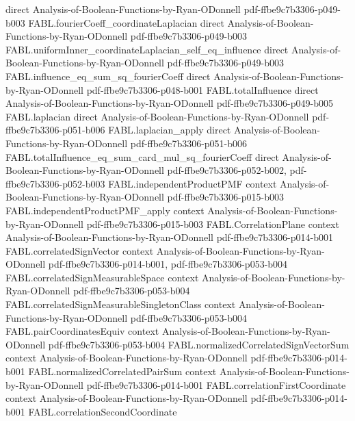 \begin{theorem}
  {direct}
  {Analysis-of-Boolean-Functions-by-Ryan-ODonnell}
  {pdf-ffbe9c7b3306-p049-b003}
\proofstep
  {FABL.fourierCoeff_coordinateLaplacian}
  {direct}
  {Analysis-of-Boolean-Functions-by-Ryan-ODonnell}
  {pdf-ffbe9c7b3306-p049-b003}
\proofstep
  {FABL.uniformInner_coordinateLaplacian_self_eq_influence}
  {direct}
  {Analysis-of-Boolean-Functions-by-Ryan-ODonnell}
  {pdf-ffbe9c7b3306-p049-b003}
\proofstep
  {FABL.influence_eq_sum_sq_fourierCoeff}
  {direct}
  {Analysis-of-Boolean-Functions-by-Ryan-ODonnell}
  {pdf-ffbe9c7b3306-p048-b001}
\proofstep
  {FABL.totalInfluence}
  {direct}
  {Analysis-of-Boolean-Functions-by-Ryan-ODonnell}
  {pdf-ffbe9c7b3306-p049-b005}
\proofstep
  {FABL.laplacian}
  {direct}
  {Analysis-of-Boolean-Functions-by-Ryan-ODonnell}
  {pdf-ffbe9c7b3306-p051-b006}
\proofstep
  {FABL.laplacian_apply}
  {direct}
  {Analysis-of-Boolean-Functions-by-Ryan-ODonnell}
  {pdf-ffbe9c7b3306-p051-b006}
\proofstep
  {FABL.totalInfluence_eq_sum_card_mul_sq_fourierCoeff}
  {direct}
  {Analysis-of-Boolean-Functions-by-Ryan-ODonnell}
  {pdf-ffbe9c7b3306-p052-b002,
    pdf-ffbe9c7b3306-p052-b003}
\proofstep
  {FABL.independentProductPMF}
  {context}
  {Analysis-of-Boolean-Functions-by-Ryan-ODonnell}
  {pdf-ffbe9c7b3306-p015-b003}
\proofstep
  {FABL.independentProductPMF_apply}
  {context}
  {Analysis-of-Boolean-Functions-by-Ryan-ODonnell}
  {pdf-ffbe9c7b3306-p015-b003}
\proofstep
  {FABL.CorrelationPlane}
  {context}
  {Analysis-of-Boolean-Functions-by-Ryan-ODonnell}
  {pdf-ffbe9c7b3306-p014-b001}
\proofstep
  {FABL.correlatedSignVector}
  {context}
  {Analysis-of-Boolean-Functions-by-Ryan-ODonnell}
  {pdf-ffbe9c7b3306-p014-b001,
    pdf-ffbe9c7b3306-p053-b004}
\proofstep
  {FABL.correlatedSignMeasurableSpace}
  {context}
  {Analysis-of-Boolean-Functions-by-Ryan-ODonnell}
  {pdf-ffbe9c7b3306-p053-b004}
\proofstep
  {FABL.correlatedSignMeasurableSingletonClass}
  {context}
  {Analysis-of-Boolean-Functions-by-Ryan-ODonnell}
  {pdf-ffbe9c7b3306-p053-b004}
\proofstep
  {FABL.pairCoordinatesEquiv}
  {context}
  {Analysis-of-Boolean-Functions-by-Ryan-ODonnell}
  {pdf-ffbe9c7b3306-p053-b004}
\proofstep
  {FABL.normalizedCorrelatedSignVectorSum}
  {context}
  {Analysis-of-Boolean-Functions-by-Ryan-ODonnell}
  {pdf-ffbe9c7b3306-p014-b001}
\proofstep
  {FABL.normalizedCorrelatedPairSum}
  {context}
  {Analysis-of-Boolean-Functions-by-Ryan-ODonnell}
  {pdf-ffbe9c7b3306-p014-b001}
\proofstep
  {FABL.correlationFirstCoordinate}
  {context}
  {Analysis-of-Boolean-Functions-by-Ryan-ODonnell}
  {pdf-ffbe9c7b3306-p014-b001}
\proofstep
  {FABL.correlationSecondCoordinate}

\end{theorem}
